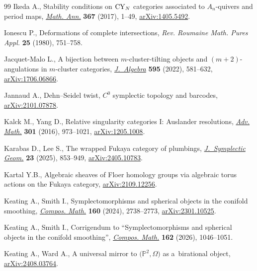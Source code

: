 \begin{thebibliography}{99}
Ikeda A., Stability conditions on {${\rm CY}_N$} categories associated to
 {$A_n$}-quivers and period maps,
 \href{https://doi.org/10.1007/s00208-016-1375-4}{\textit{Math. Ann.}}
 \textbf{367} (2017), 1--49,
 \href{http://arxiv.org/abs/1405.5492}{arXiv:1405.5492}.

Ionescu P., Deformations of complete intersections, \textit{Rev. Roumaine Math.
 Pures Appl.} \textbf{25} (1980), 751--758.

Jacquet-Malo L., A bijection between {$m$}-cluster-tilting objects and
 {$(m+2)$}-angulations in {$m$}-cluster categories,
 \href{https://doi.org/10.1016/j.jalgebra.2021.11.041}{\textit{J.~Algebra}}
 \textbf{595} (2022), 581--632,
 \href{http://arxiv.org/abs/1706.06866}{arXiv:1706.06866}.

Jannaud A., Dehn--{S}eidel twist, ${C}^0$ symplectic topology and barcodes,
 \href{http://arxiv.org/abs/2101.07878}{arXiv:2101.07878}.

Kalck M., Yang D., Relative singularity categories {I}: {A}uslander
 resolutions, \href{https://doi.org/10.1016/j.aim.2016.06.011}{\textit{Adv.
 Math.}} \textbf{301} (2016), 973--1021,
 \href{http://arxiv.org/abs/1205.1008}{arXiv:1205.1008}.

Karabas D., Lee S., The wrapped {F}ukaya category of plumbings,
 \href{https://doi.org/10.4310/jsg.250820172316}{\textit{J.~Symplectic Geom.}}
 \textbf{23} (2025), 853--949,
 \href{http://arxiv.org/abs/2405.10783}{arXiv:2405.10783}.

Kartal Y.B., Algebraic sheaves of {F}loer homology groups via algebraic torus
 actions on the {F}ukaya category,
 \href{http://arxiv.org/abs/2109.12256}{arXiv:2109.12256}.

Keating A., Smith I., Symplectomorphisms and spherical objects in the conifold
 smoothing, \href{https://doi.org/10.1112/S0010437X24007425}{\textit{Compos.
 Math.}} \textbf{160} (2024), 2738--2773,
 \href{http://arxiv.org/abs/2301.10525}{arXiv:2301.10525}.

Keating A., Smith I., Corrigendum to ``Symplectomorphisms and spherical objects
 in the conifold smoothing'',
 \href{https://doi.org/10.1017/S0010437X26103297}{\textit{Compos. Math.}}
 \textbf{162} (2026), 1046--1051.

Keating A., Ward A., A universal mirror to $\bigl(\mathbb{P}^2,\Omega\bigr)$ as
 a~birational object,
 \href{http://arxiv.org/abs/2408.03764}{arXiv:2408.03764}.


\end{thebibliography}
